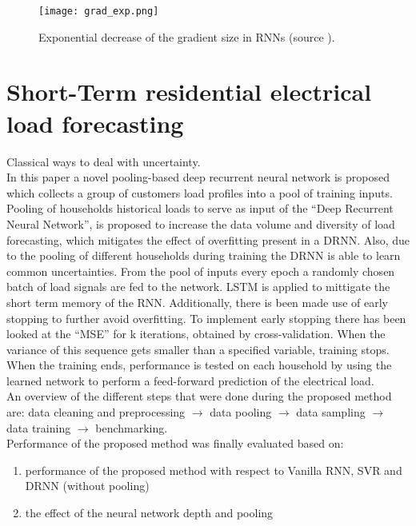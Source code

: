 \begin{figure}[h!]
	\centering
	\texttt{[image: grad\_exp.png]}
	\caption{Exponential decrease of the gradient size in RNNs (source \cite{Teuwen2019}).}
	\label{fig:grad_exp}
\end{figure}



\section{Short-Term residential electrical load forecasting}
Classical ways to deal with uncertainty.\\


In this paper \cite{Shi2018} a novel pooling-based deep recurrent neural network is proposed which collects a group of customers load profiles into a pool of training inputs. Pooling of households historical loads to serve as input of the ``Deep Recurrent Neural Network'', is proposed to increase the data volume and diversity of load forecasting, which mitigates the effect of overfitting present in a DRNN. Also, due to the pooling of different households during training the DRNN is able to learn common uncertainties. From the pool of inputs every epoch a randomly chosen batch of load signals are fed to the network. LSTM is applied to mittigate the short term memory of the RNN. Additionally, there is been made use of early stopping to further avoid overfitting. To implement early stopping there has been looked at the ``MSE'' for k iterations, obtained by cross-validation. When the variance of this sequence gets smaller than a specified variable, training stops. When the training ends, performance is tested on each household by using the learned network to perform a feed-forward prediction of the electrical load.\\

An overview of the different steps that were done during the proposed method are: data cleaning and preprocessing $\rightarrow$ data pooling $\rightarrow$ data sampling $\rightarrow$ data training $\rightarrow$ benchmarking.\\

Performance of the proposed method was finally evaluated based on: 
\begin{enumerate}
	\item performance of the proposed method with respect to Vanilla RNN, SVR and DRNN (without pooling)
	\item the effect of the neural network depth and pooling
\end{enumerate}

